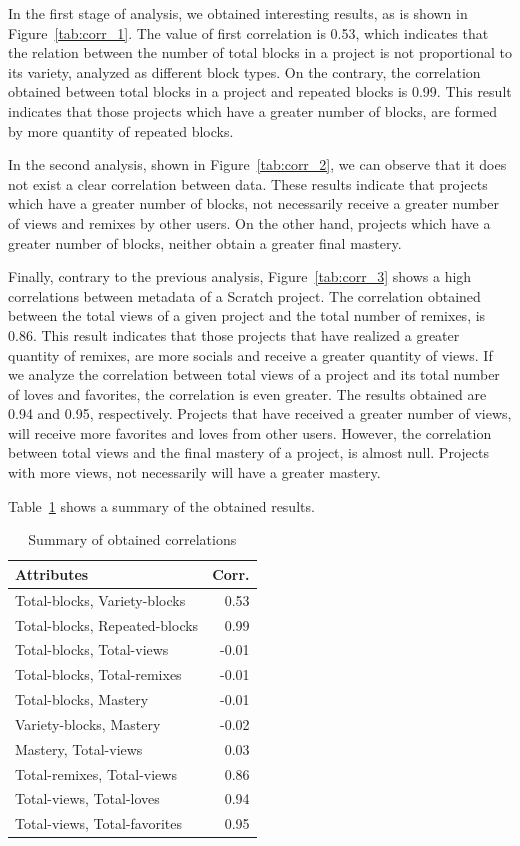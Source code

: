 \documentclass[a4paper,twocolumn,10pt]{article}
\begin{document}
In the first stage of analysis, we obtained interesting results, as is shown in
Figure~\ref{tab:corr_1}. The value of first correlation is 0.53, which indicates that the 
relation between the number of total blocks in a project is not proportional
to its variety, analyzed as different block types. On the contrary, the
correlation obtained between total blocks in a project and repeated blocks is
0.99. This result indicates that those projects which have a greater number of 
blocks, are formed by more quantity of repeated blocks.

In the second analysis, shown in Figure~\ref{tab:corr_2}, we can observe that it does not exist
a clear correlation between data. These results indicate that projects which have
a greater number of blocks, not necessarily receive a greater number of views and
remixes by other users. On the other hand, projects which have a greater number of
blocks, neither obtain a greater final mastery.

Finally, contrary to the previous analysis, Figure~\ref{tab:corr_3} shows a high correlations 
between metadata of a Scratch project. The correlation obtained between the total
views of a given project and the total number of remixes, is 0.86. This result 
indicates that those projects that have realized a greater quantity of remixes,
are more socials and receive a greater quantity of views. If we analyze the 
correlation between total views of a project and its total number of loves and
favorites, the correlation is even greater. The results obtained are 0.94 and 0.95,
respectively. Projects that have received a greater number of views, will receive more
favorites and loves from other users. However, the correlation between total views and the
final mastery of a project, is almost null. Projects with more views, not necessarily
will have a greater mastery.

Table~\ref{tab:values} shows a summary of the obtained results.

\begin{table}
   \begin{tabular}{lr}
    \toprule
    \textbf{Attributes} &\textbf{Corr.} \\
    \midrule
	Total-blocks, Variety-blocks & 0.53\\
        Total-blocks, Repeated-blocks & 0.99\\
        Total-blocks, Total-views & -0.01\\
        Total-blocks, Total-remixes & -0.01\\
        Total-blocks, Mastery & -0.01\\
        Variety-blocks, Mastery & -0.02 \\
        Mastery, Total-views & 0.03\\
        Total-remixes, Total-views & 0.86\\
        Total-views, Total-loves & 0.94\\
        Total-views, Total-favorites & 0.95\\
    \bottomrule
    \end{tabular}
    \caption{Summary of obtained correlations}
    \label{tab:values}
\end{table}
\end{document}

